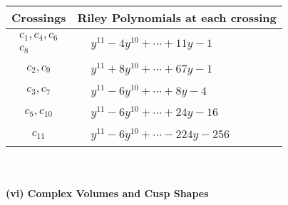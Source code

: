 \documentclass[1p]{elsarticle_modified}
\theoremstyle{definition}
\begin{document}
\begin{tabular}{m{50pt}|m{274pt}}
Crossings & \hspace{64pt}Riley Polynomials at each crossing \\
\hline $$\begin{aligned}c_{1},c_{4},c_{6}\\c_{8}\end{aligned}$$&$\begin{aligned}
&y^{11}-4 y^{10}+\cdots+11 y-1
\end{aligned}$\\
\hline $$\begin{aligned}c_{2},c_{9}\end{aligned}$$&$\begin{aligned}
&y^{11}+8 y^{10}+\cdots+67 y-1
\end{aligned}$\\
\hline $$\begin{aligned}c_{3},c_{7}\end{aligned}$$&$\begin{aligned}
&y^{11}-6 y^{10}+\cdots+8 y-4
\end{aligned}$\\
\hline $$\begin{aligned}c_{5},c_{10}\end{aligned}$$&$\begin{aligned}
&y^{11}-6 y^{10}+\cdots+24 y-16
\end{aligned}$\\
\hline $$\begin{aligned}c_{11}\end{aligned}$$&$\begin{aligned}
&y^{11}-6 y^{10}+\cdots-224 y-256
\end{aligned}$\\
\hline
\end{tabular}\\~\\
\newpage\flushleft \textbf{(vi) Complex Volumes and Cusp Shapes}
\end{document}
